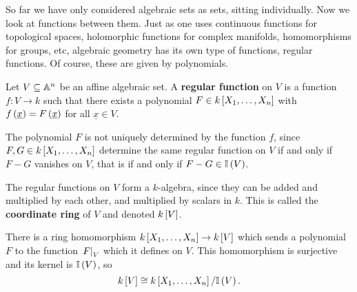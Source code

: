 
So far we have only considered algebraic sets as sets, sitting individually. Now we look at functions between them. Just as one uses continuous functions for topological spaces, holomorphic functions for complex manifolds, homomorphisms for groups, etc, algebraic geometry has its own type of functions, regular functions. Of course, these are given by polynomials.

\begin{definition*}
Let $ V \subseteq \AA^n $ be an affine algebraic set. A \textbf{regular function} on $ V $ is a function $ f : V \to k $ such that there exists a polynomial $ F \in k\sbr{X_1, \dots, X_n} $ with $ f\br{\underline{x}} = F\br{\underline{x}} $ for all $ \underline{x} \in V $.
\end{definition*}

\begin{note*}
The polynomial $ F $ is not uniquely determined by the function $ f $, since $ F, G \in k\sbr{X_1, \dots, X_n} $ determine the same regular function on $ V $ if and only if $ F - G $ vanishes on $ V $, that is if and only if $ F - G \in \II\br{V} $.
\end{note*}

\begin{definition*}
The regular functions on $ V $ form a $ k $-algebra, since they can be added and multiplied by each other, and multiplied by scalars in $ k $. This is called the \textbf{coordinate ring} of $ V $ and denoted $ k\sbr{V} $.
\end{definition*}

There is a ring homomorphism $ k\sbr{X_1, \dots, X_n} \to k\sbr{V} $ which sends a polynomial $ F $ to the function $ \eval{F}_V $ which it defines on $ V $. This homomorphism is surjective and its kernel is $ \II\br{V} $, so
$$ k\sbr{V} \cong k\sbr{X_1, \dots, X_n} / \II\br{V}. $$

